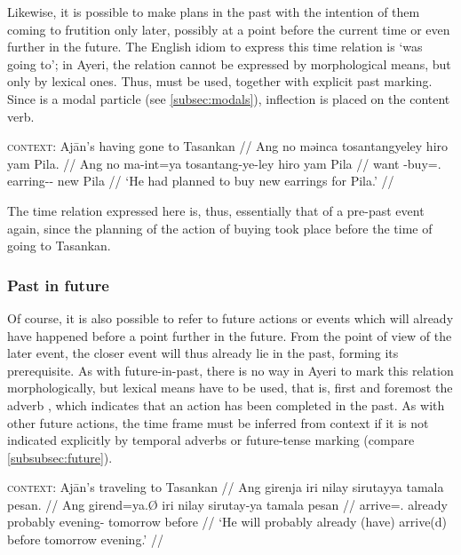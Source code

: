 Likewise, it is possible to make plans in the past with the intention of them 
coming to frutition only later, possibly at a point before the current time or 
even further in the future. The English idiom to express this time relation is 
`was going to'; in Ayeri, the relation cannot be expressed by morphological 
means, but only by lexical ones. Thus,  must 
be used, together with explicit past marking. Since  is a modal 
particle (see \autoref{subsec:modals}), inflection is placed on the content 
verb.

\ex
\begingl
	\glpreamble \textsc{context}: Ajān's having gone to Tasankan //
	\gla Ang no məinca tosantangyeley hiro yam Pila. //
	\glb Ang no ma-int=ya tosantang-ye-ley hiro yam Pila //
	\glc \AgtT{} want \Pst{}-buy=\TsgM{}.\Top{} earring-\Pl{}-\PargI{} new 
		\Dat{} Pila //
	\glft `He had planned to buy new earrings for Pila.' //
\endgl
\xe

The time relation expressed here is, thus, essentially that of a pre-past 
event again, since the planning of the action of buying took place before 
the time of going to Tasankan.


\subsubsection{Past in future}

Of course, it is also possible to refer to future actions or events which will 
already have happened before a point further in the future. From the point 
of view of the later event, the closer event will thus already lie in the 
past, forming its prerequisite. As with future-in-past, there is no way in 
Ayeri to mark this relation morphologically, but lexical means have to 
be used, that is, first and foremost the adverb , which 
indicates that an action has been completed in the past. As with other 
future actions, the time frame must be inferred from context if it is 
not indicated explicitly by temporal adverbs or future-tense marking (compare 
\autoref{subsubsec:future}).

\ex
\begingl
	\glpreamble \textsc{context}: Ajān's traveling to Tasankan //
	\gla Ang girenja iri nilay sirutayya tamala pesan. //
	\glb Ang girend=ya.Ø iri nilay sirutay-ya tamala pesan //
	\glc \AgtT{} arrive=\TsgM{}.\Top{} already 
		probably evening-\Loc{} tomorrow before //
	\glft `He will probably already (have) arrive(d) before 
		tomorrow evening.' //
\endgl
\xe

